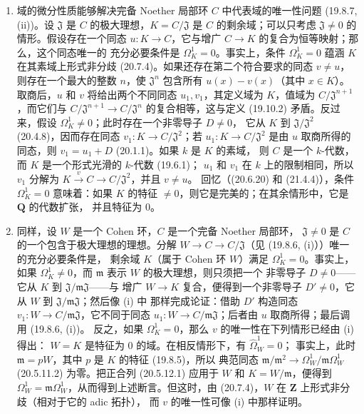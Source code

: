 \begin{remarks}[21.5.3]
\label{0.21.5.3-fr}
\begin{enumerate}
  \item[(i)] 域的微分性质能够解决完备 Noether 局部环 $C$ 中代表域的唯一性问题
  (19.8.7, (ii))。设 $\mathfrak J$ 是 $C$ 的极大理想，$K=C/\mathfrak J$
  是 $C$ 的剩余域；可以只考虑 $\mathfrak J\ne0$ 的情形。假设存在一个同态
  $u:K\to C$，它与增广 $C\to K$ 的复合为恒等映射；那么，这个同态唯一的
  充分必要条件是 $\Omega^1_K=0$。事实上，条件 $\Omega^1_K=0$ 蕴涵 $K$
  在其素域上形式非分歧 (20.7.4)。如果还存在第二个符合要求的同态
  $v\ne u$，则存在一个最大的整数 $n$，使 $\mathfrak J^n$ 包含所有
  $u(x)-v(x)$（其中 $x\in K$）。取商后，$u$ 和 $v$ 将给出两个不同同态
  $u_1,v_1$，其定义域为 $K$，值域为 $C/\mathfrak J^{n+1}$，而它们与
  $C/\mathfrak J^{n+1}\to C/\mathfrak J^n$ 的复合相等，这与定义 (19.10.2)
  矛盾。反过来，假设 $\Omega^1_K\ne0$；此时存在一个非零导子 $D\ne0$，
  它从 $K$ 到 $\mathfrak J/\mathfrak J^2$ (20.4.8)，因而存在同态
  $v_1:K\to C/\mathfrak J^2$；若 $u_1:K\to C/\mathfrak J^2$ 是由 $u$
  取商所得的同态，则 $v_1=u_1+D$ (20.1.1)。如果 $k$ 是 $K$ 的素域，
  则 $C$ 是一个 $k$-代数，而 $K$ 是一个形式光滑的 $k$-代数 (19.6.1)；
  $u_1$ 和 $v_1$ 在 $k$ 上的限制相同，所以 $v_1$ 分解为
  $K\xrightarrow{v}C\to C/\mathfrak J^2$，并且 $v\ne u$。
  回忆（(20.6.20) 和 (21.4.4)），条件 $\Omega^1_K=0$ 意味着：如果 $K$
  的特征 $\ne0$，则它是完美的；在其余情形中，它是 $\mathbf Q$ 的代数扩张，
  并且特征为 $0$。
  \item[(ii)] 同样，设 $W$ 是一个 Cohen 环，$C$ 是一个完备 Noether 局部环，
  $\mathfrak J\ne0$ 是 $C$ 的一个包含于极大理想的理想。分解
  $W\to C\to C/\mathfrak J$（见 (19.8.6, (i)））唯一的充分必要条件是，
  剩余域 $K$（属于 Cohen 环 $W$）满足 $\Omega^1_K=0$。事实上，如果
  $\Omega^1_K\ne0$，而 $\mathfrak m$ 表示 $W$ 的极大理想，则只须把一个
  非零导子 $D\ne0$——它从 $K$ 到 $\mathfrak J/\mathfrak m\mathfrak J$——与
  增广 $W\to K$ 复合，便得到一个非零导子 $D'\ne0$，它从 $W$ 到
  $\mathfrak J/\mathfrak m\mathfrak J$；然后像 (i) 中
  那样完成论证：借助 $D'$ 构造同态
  $v_1:W\to C/\mathfrak m\mathfrak J$，它不同于同态
  $u_1:W\to C/\mathfrak m\mathfrak J$；后者由 $u$ 取商所得；最后调用 (19.8.6, (i))。
  反之，如果 $\Omega^1_K=0$，那么 $v$ 的唯一性在下列情形已经由 (i) 得出：
  $W=K$ 是特征为 $0$ 的域。在相反情形下，有 $\widehat{\Omega}^1_W=0$；
  事实上，此时 $\mathfrak m=pW$，其中 $p$ 是 $K$ 的特征 (19.8.5)，所以
  典范同态 $\mathfrak m/\mathfrak m^2\to\Omega^1_W/\mathfrak m\Omega^1_W$
  (20.5.11.2) 为零。把正合列
  (20.5.12.1) 应用于 $W$ 和 $K=W/\mathfrak m$，便得到
  $\Omega^1_W=\mathfrak m\Omega^1_W$，从而得到上述断言。但这时，由
  (20.7.4)，$W$ 在 $\mathbf Z$ 上形式非分歧（相对于它的 adic 拓扑），
  而 $v$ 的唯一性可像 (i) 中那样证明。
\end{enumerate}
\end{remarks}

